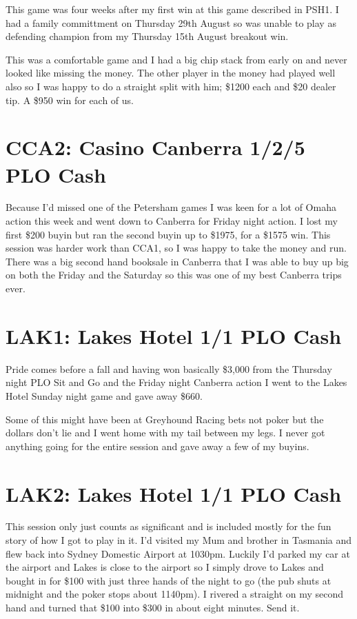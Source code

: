 This game was four weeks after my first win at this game described in
PSH1. I had a family committment on Thursday 29th August so was unable
to play as defending champion from my Thursday 15th August breakout
win.

This was a comfortable game and I had a big chip stack from early on
and never looked like missing the money. The other player in the money
had played well also so I was happy to do a straight split with him;
\$1200 each and \$20 dealer tip. A \$950 win for each of us.

\section*{CCA2: Casino Canberra 1/2/5 PLO Cash}

Because I'd missed one of the Petersham games I was keen for a lot of
Omaha action this week and went down to Canberra for Friday night
action. I lost my first \$200 buyin but ran the second buyin up to
\$1975, for a \$1575 win. This session was harder work than CCA1, so I
was happy to take the money and run. There was a big second hand
booksale in Canberra that I was able to buy up big on both the Friday
and the Saturday so this was one of my best Canberra trips ever.

\section*{LAK1: Lakes Hotel 1/1 PLO Cash}

Pride comes before a fall and having won basically \$3,000 from the
Thursday night PLO Sit and Go and the Friday night Canberra action I
went to the Lakes Hotel Sunday night game and gave away \$660.

Some of this might have been at Greyhound Racing bets not poker but
the dollars don't lie and I went home with my tail between my legs. I
never got anything going for the entire session and gave away a few of
my buyins.

\section*{LAK2: Lakes Hotel 1/1 PLO Cash}

This session only just counts as significant and is included mostly
for the fun story of how I got to play in it. I'd visited my Mum and
brother in Tasmania and flew back into Sydney Domestic Airport at
1030pm. Luckily I'd parked my car at the airport and Lakes is close to
the airport so I simply drove to Lakes and bought in for \$100 with
just three hands of the night to go (the pub shuts at midnight and the
poker stops about 1140pm). I rivered a straight on my second hand and
turned that \$100 into \$300 in about eight minutes. Send it.

